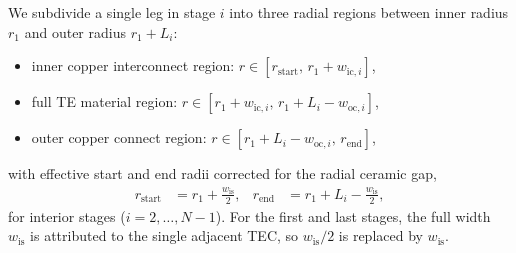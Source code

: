 \documentclass[conference]{IEEEtran}
\begin{document}
We subdivide a single leg in stage $i$ into three radial regions between inner radius $r_1$ and outer radius $r_1 + L_i$:
\begin{itemize}
	\item inner copper interconnect region: $r \in [r_{\text{start}},\, r_1 + w_{\text{ic},i}]$,
	\item full TE material region: $r \in [r_1 + w_{\text{ic},i},\, r_1 + L_i - w_{\text{oc},i}]$,
	\item outer copper connect region: $r \in [r_1 + L_i - w_{\text{oc},i},\, r_{\text{end}}]$,
\end{itemize}
with effective start and end radii corrected for the radial ceramic gap,
\begin{align}
	r_{\text{start}} &= r_1 + \frac{w_{\text{is}}}{2}, &
	r_{\text{end}} &= r_1 + L_i - \frac{w_{\text{is}}}{2},
\end{align}
for interior stages ($i=2,\dots,N-1$). For the first and last stages, the full width $w_{\text{is}}$ is attributed to the single adjacent TEC, so $w_{\text{is}}/2$ is replaced by $w_{\text{is}}$.
\end{document}
